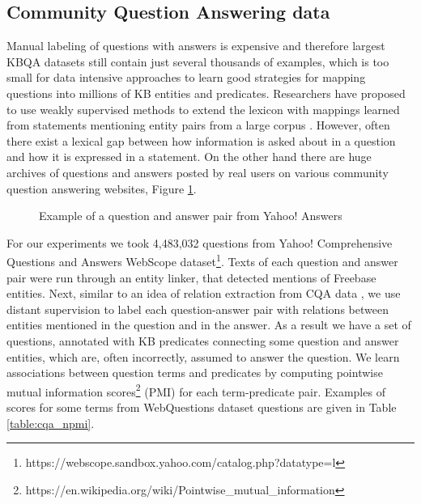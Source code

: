 \subsection{Community Question Answering data}
\label{section:method:cqa}

Manual labeling of questions with answers is expensive and therefore largest KBQA datasets still contain just several thousands of examples, which is too small for data intensive approaches to learn good strategies for mapping questions into millions of KB entities and predicates.
Researchers have proposed to use weakly supervised methods to extend the lexicon with mappings learned from statements mentioning entity pairs from a large corpus \cite{yao2014information}.
However, often there exist a lexical gap between how information is asked about in a question and how it is expressed in a statement.
On the other hand there are huge archives of questions and answers posted by real users on various community question answering websites, \eg Figure \ref{fig:cqa_example}.

\begin{figure}
\centering
{}
\caption{Example of a question and answer pair from Yahoo! Answers}
\label{fig:cqa_example}
\end{figure}

For our experiments we took 4,483,032 questions from Yahoo! Comprehensive Questions and Answers WebScope dataset\footnote{https://webscope.sandbox.yahoo.com/catalog.php?datatype=l}.
Texts of each question and answer pair were run through an entity linker, that detected mentions of Freebase entities.
Next, similar to an idea of relation extraction from CQA data \cite{savenkov-EtAl:2015:SRW}, we use distant supervision to label each question-answer pair with relations between entities mentioned in the question and in the answer.
As a result we have a set of questions, annotated with KB predicates connecting some question and answer entities, which are, often incorrectly, assumed to answer the question.
We learn associations between question terms and predicates by computing pointwise mutual information scores\footnote{https://en.wikipedia.org/wiki/Pointwise\_mutual\_information} (PMI) for each term-predicate pair.
Examples of scores for some terms from WebQuestions dataset questions are given in Table \ref{table:cqa_npmi}.

